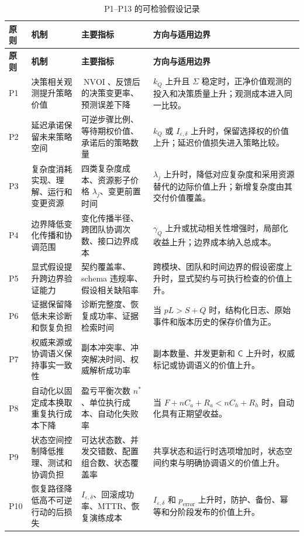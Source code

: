 \documentclass[11pt,a4paper]{ctexart}
\numberwithin{equation}{section}
\theoremstyle{definition}
\theoremstyle{plain}
\newcommand{\Ctrl}{\mathsf{C}}
\newcommand{\Learn}{\Sigma}
\begin{document}
\small
\begin{longtable}{>{\raggedright\arraybackslash}p{}
                  >{\raggedright\arraybackslash}p{}
                  >{\raggedright\arraybackslash}p{}
                  >{\raggedright\arraybackslash}p{}}
\caption{P1--P13 的可检验假设记录}\label{tab:testable-principles}\\
\toprule
\textbf{原则} & \textbf{机制} & \textbf{主要指标} & \textbf{方向与适用边界}\\
\midrule
\endfirsthead
\toprule
\textbf{原则} & \textbf{机制} & \textbf{主要指标} & \textbf{方向与适用边界}\\
\midrule
\endhead
P1 & 决策相关观测提升策略价值 & $\operatorname{NVOI}$、反馈后的决策变更率、预测误差下降 & $k_Q$ 上升且 $\Learn$ 稳定时，正净价值观测的投入和决策质量上升；观测成本进入同一比较。\\
P2 & 延迟承诺保留未来策略空间 & 可逆步骤比例、等待期权价值、承诺后的策略数量 & $k_Q$ 或 $I_{\varepsilon,\delta}$ 上升时，保留选择权的价值上升；延迟价值损失进入策略比较。\\
P3 & 复杂度消耗实现、理解、运行和变更资源 & 四类复杂度成本、资源影子价格 $\lambda_j$、变更前置时间 & $\lambda_j$ 上升时，降低对应复杂度和采用资源替代的边际价值上升；新增复杂度由其交付价值覆盖。\\
P4 & 边界降低变化传播和协调范围 & 变化传播半径、跨团队协调次数、接口边界成本 & $\gamma_Q$ 上升或扰动相关性增强时，局部化收益上升；边界成本纳入总成本。\\
P5 & 显式假设提升跨边界验证能力 & 契约覆盖率、schema 违规率、假设相关缺陷率 & 跨模块、团队和时间边界的假设密度上升时，显式契约与可执行检查的价值上升。\\
P6 & 证据保留降低未来诊断和恢复负担 & 诊断完整度、恢复成功率、证据检索时间 & 当 $pL>S+Q$ 时，结构化日志、原始事件和版本历史的保存价值为正。\\
P7 & 权威来源或协调语义保持事实一致性 & 副本冲突率、冲突解决时间、权威解析成功率 & 副本数量、并发更新和 $\Ctrl$ 上升时，权威标记或协调语义的价值上升。\\
P8 & 自动化以固定成本换取重复执行成本下降 & 盈亏平衡次数 $n^*$、单位执行成本、自动化失败率 & 当 $F+nC_a+R_a<nC_h+R_h$ 时，自动化具有正期望收益。\\
P9 & 状态空间控制降低推理、测试和协调负担 & 可达状态数、并发交错数、配置组合数、状态覆盖率 & 共享状态和运行时选项增加时，状态空间约束与明确协调语义的价值上升。\\
P10 & 恢复路径降低高不可逆行动的后损失 & $I_{\varepsilon,\delta}$、回滚成功率、MTTR、恢复演练成本 & $I_{\varepsilon,\delta}$ 和 $p_{\mathrm{error}}$ 上升时，防护、备份、幂等和分阶段发布的价值上升。\\

\end{longtable}
\end{document}

